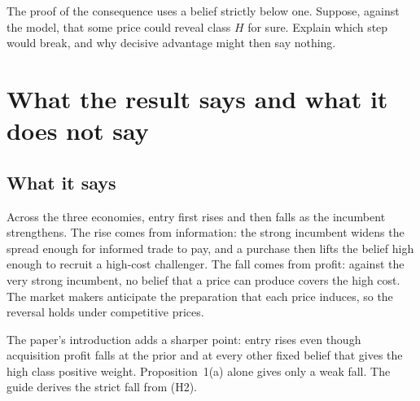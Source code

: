\begin{checkyourself}
The proof of the consequence uses a belief strictly below one. Suppose, against the model, that some price could
reveal class \(H\) for sure. Explain which step would break, and why decisive advantage might then say nothing.
\label{q:ccc-decisive}
\end{checkyourself}

\section{What the result says and what it does not say}\label{sec:ccc-reading}

\subsection{What it says}

Across the three economies, entry first rises and then falls as the incumbent strengthens. The rise comes from
information: the strong incumbent widens the spread enough for informed trade to pay, and a purchase then lifts the
belief high enough to recruit a high-cost challenger. The fall comes from profit: against the very strong incumbent,
no belief that a price can produce covers the high cost. The market makers anticipate the preparation that each
price induces, so the reversal holds under competitive prices.

The paper's introduction adds a sharper point: entry rises even though acquisition profit falls at the prior and at
every other fixed belief that gives the high class positive weight. Proposition~1(a) alone gives only a weak fall.
The guide derives the strict fall from (H2).

